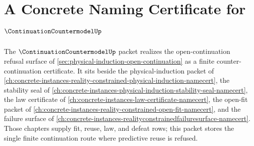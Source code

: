 \chapter{A Concrete Naming Certificate for $\ContinuationCountermodelUp$}
\label{ch:concrete-instances-continuationcountermodel-namecert}

The $\ContinuationCountermodelUp$ packet realizes the open-continuation refusal surface of \autoref{sec:physical-induction-open-continuation} as a finite counter-continuation certificate. It sits beside the physical-induction packet of \autoref{ch:concrete-instances-reality-constrained-physical-induction-namecert}, the stability seal of \autoref{ch:concrete-instances-physical-induction-stability-seal-namecert}, the law certificate of \autoref{ch:concrete-instances-law-certificate-namecert}, the open-fit packet of \autoref{ch:concrete-instances-reality-constrained-open-fit-namecert}, and the failure surface of \autoref{ch:concrete-instances-realityconstrainedfailuresurface-namecert}. Those chapters supply fit, reuse, law, and defeat rows; this packet stores the single finite continuation route where predictive reuse is refused.


